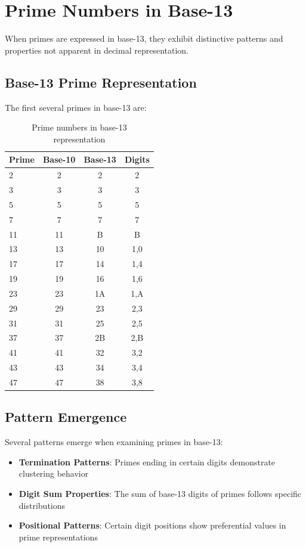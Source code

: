\documentclass[12pt,a4paper]{report}
\begin{document}
\section{Prime Numbers in Base-13}

When primes are expressed in base-13, they exhibit distinctive patterns and properties not apparent in decimal representation.

\subsection{Base-13 Prime Representation}

The first several primes in base-13 are:

\begin{table}[h]
\centering
\begin{tabular}{|l|c|c|c|}
\hline
\textbf{Prime} & \textbf{Base-10} & \textbf{Base-13} & \textbf{Digits} \\
\hline
2 & 2 & 2 & 2 \\
3 & 3 & 3 & 3 \\
5 & 5 & 5 & 5 \\
7 & 7 & 7 & 7 \\
11 & 11 & B & B \\
13 & 13 & 10 & 1,0 \\
17 & 17 & 14 & 1,4 \\
19 & 19 & 16 & 1,6 \\
23 & 23 & 1A & 1,A \\
29 & 29 & 23 & 2,3 \\
31 & 31 & 25 & 2,5 \\
37 & 37 & 2B & 2,B \\
41 & 41 & 32 & 3,2 \\
43 & 43 & 34 & 3,4 \\
47 & 47 & 38 & 3,8 \\
\hline
\end{tabular}
\caption{Prime numbers in base-13 representation}
\end{table}

\subsection{Pattern Emergence}

Several patterns emerge when examining primes in base-13:

\begin{itemize}
\item \textbf{Termination Patterns}: Primes ending in certain digits demonstrate clustering behavior
\item \textbf{Digit Sum Properties}: The sum of base-13 digits of primes follows specific distributions
\item \textbf{Positional Patterns}: Certain digit positions show preferential values in prime representations
\end{itemize}
\end{document}
